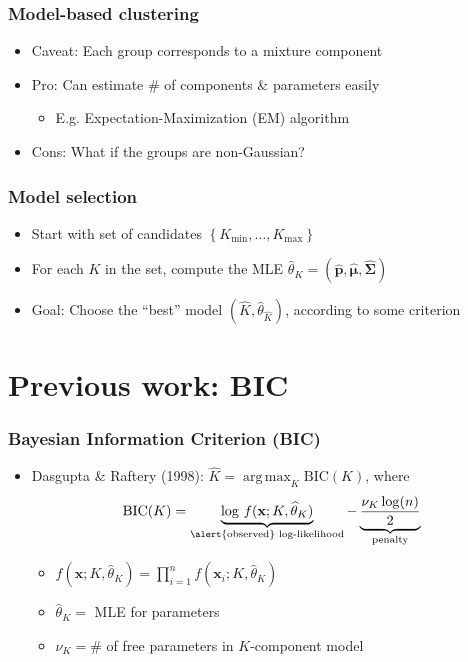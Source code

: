 \documentclass[mathserif,compress]{beamer}
\newcommand*\ba{\[ \begin{aligned}}
\newcommand*\ea{\end{aligned} \]}
\newcommand*\set[1]{\left\{#1\right\}}
\newcommand*\estim[1]{\widehat{#1}}
\DeclareMathOperator*{\argmax}{arg\;max}
\renewcommand\;{\,}
\newcommand{\bx}{\mathbf{x}}
\begin{document}
\begin{frame}\frametitle{Model-based clustering}
\begin{itemize}
\item[] \alert{Caveat:} Each group corresponds to a mixture component
\bigskip
\item[]
\alert{Pro:} Can estimate \# of components \& parameters easily
\bigskip
\begin{itemize}
\item E.g. Expectation-Maximization (EM) algorithm
\end{itemize}
\bigskip
\item[]
\alert{Cons:} What if the groups are non-Gaussian?
\end{itemize}
\end{frame}

\begin{frame}\frametitle{Model selection}
\begin{itemize}
\item[]
Start with set of candidates $\set{K_\text{min}, \dotsc, K_\text{max}}$ 
\bigskip
\item[]
For each $K$ in the set, 
compute the MLE 
$\estim\theta_K = (\estim{\mathbf p}, \estim{\pmb\mu}, \estim{\pmb\Sigma})$
\bigskip
\item[]
\alert{Goal}: Choose the ``best'' model $\left(\estim K, \estim\theta_{\estim K}\right)$, according to some criterion
\end{itemize}
\end{frame}

\section{Previous work: BIC}
\begin{frame}\frametitle{Bayesian Information Criterion (BIC)}
\begin{itemize}
\item[]
Dasgupta \& Raftery (1998): $\estim K = \argmax_K \text{BIC}(K)$, where
\ba
\text{BIC}(K)
	= \underbrace{\log \; f(\bx; K, \estim\theta_K)}_\text{\alert{observed} log-likelihood} 
	- \underbrace{\frac{\nu_K \log(n)}{2}}_\text{penalty}
\ea
\begin{itemize}
\item
$f(\bx; K, \estim\theta_K) = \prod_{i=1}^n f(\bx_i; K, \estim\theta_K)$
\bigskip
\item
$\estim\theta_K = $ MLE for parameters
\bigskip
\item
$\nu_K = \# $ of free parameters in $K$-component model
\end{itemize}
\end{itemize}
\end{frame}
\end{document}
